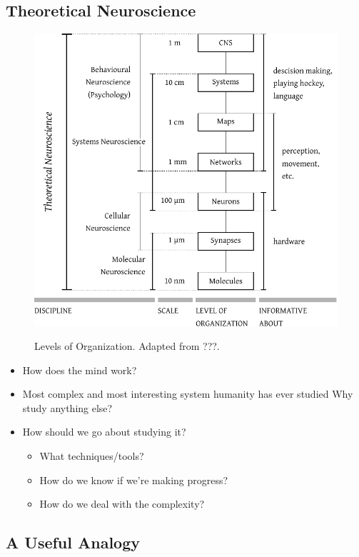 \documentclass[10pt,letterpaper,oneside]{article}
\begin{document}
\subsection{Theoretical Neuroscience}

\begin{figure}
	\includegraphics{media/levels.pdf}\\
	\caption{Levels of Organization. Adapted from ???.}
	\label{fig:levels}
\end{figure}

\begin{itemize}
	\item How does the mind work?
	\item Most complex and most interesting system humanity has ever studied Why study anything else?
	\item How should we go about studying it?
	\begin{itemize}
		\item What techniques/tools?
		\item How do we know if we're making progress?
		\item How do we deal with the complexity?
	\end{itemize}
\end{itemize}

\newpage

\subsection{A Useful Analogy}
\end{document}
